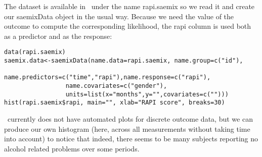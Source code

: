 The dataset is available in \monolix~under the name {\sf rapi.saemix} so we read it and create our saemixData object in the usual way. Because we need the value of the outcome to compute the corresponding likelihood, the {\sf rapi} column is used both as a predictor and as the response:
\begin{verbatim}
data(rapi.saemix)
saemix.data<-saemixData(name.data=rapi.saemix, name.group=c("id"),
                 name.predictors=c("time","rapi"),name.response=c("rapi"),
                 name.covariates=c("gender"),
                 units=list(x="months",y="",covariates=c("")))
hist(rapi.saemix$rapi, main="", xlab="RAPI score", breaks=30)
\end{verbatim}
\monolix~currently does not have automated plots for discrete outcome data, but we can produce our own histogram (here, across all measurements without taking time into account) to notice that indeed, there seems to be many subjects reporting no alcohol related problems over some periods.

